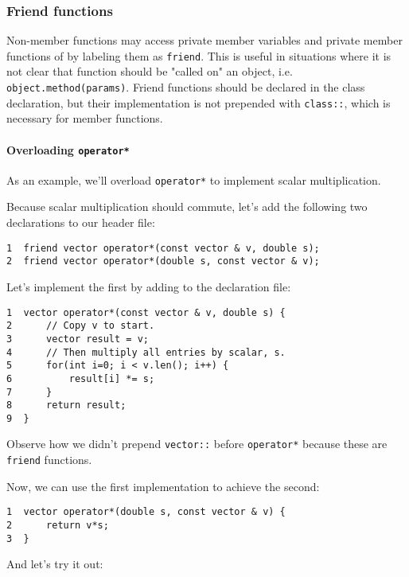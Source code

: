 \documentclass[11pt]{article}
\begin{document}
\subsubsection{Friend functions}
\label{sec:orgheadline58}

Non-member functions may access private member variables and private member 
functions of by labeling them as \texttt{friend}. This is useful in situations where 
it is not clear that function should be "called on" an object, i.e. 
\texttt{object.method(params)}. Friend functions should be declared in the class 
declaration, but their implementation is not prepended with \texttt{class::}, which 
is necessary for member functions.

\paragraph{Overloading \texttt{operator*}}
\label{sec:orgheadline56}

As an example, we'll overload \texttt{operator*} to implement scalar multiplication.

Because scalar multiplication should commute, let's add the following
two declarations to our header file:

\begin{verbatim}
1  friend vector operator*(const vector & v, double s);
2  friend vector operator*(double s, const vector & v);
\end{verbatim}

Let's implement the first by adding to the declaration file:

\begin{verbatim}
1  vector operator*(const vector & v, double s) {
2      // Copy v to start.
3      vector result = v;
4      // Then multiply all entries by scalar, s.
5      for(int i=0; i < v.len(); i++) {
6          result[i] *= s;
7      }
8      return result;
9  }
\end{verbatim}

Observe how we didn't prepend \texttt{vector::} before \texttt{operator*} because 
these are \texttt{friend} functions.

Now, we can use the first implementation to achieve the second:

\begin{verbatim}
1  vector operator*(double s, const vector & v) {
2      return v*s;
3  }
\end{verbatim}

And let's try it out:
\end{document}
